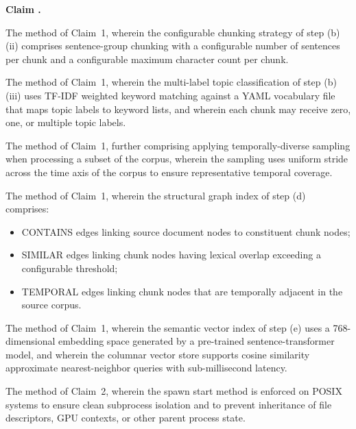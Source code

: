 \documentclass[12pt,letterpaper]{article}
\newcounter{claimnum}
\newenvironment{claims}
  {\begin{list}{\textbf{Claim \arabic{claimnum}.}}
      {\usecounter{claimnum}
       \setlength{\labelwidth}{1.8cm}
       \setlength{\labelsep}{0.4cm}
       \setlength{\leftmargin}{2.2cm}
       \setlength{\itemsep}{12pt}
       \setlength{\parsep}{4pt}}}
  {\end{list}}
\begin{document}
\begin{claims}
\setcounter{claimnum}{3}

\item The method of Claim~1, wherein the configurable chunking strategy of step
(b)(ii) comprises sentence-group chunking with a configurable number of sentences per
chunk and a configurable maximum character count per chunk.

\item The method of Claim~1, wherein the multi-label topic classification of step
(b)(iii) uses TF-IDF weighted keyword matching against a YAML vocabulary file that maps
topic labels to keyword lists, and wherein each chunk may receive zero, one, or multiple
topic labels.

\item The method of Claim~1, further comprising applying temporally-diverse sampling
when processing a subset of the corpus, wherein the sampling uses uniform stride across
the time axis of the corpus to ensure representative temporal coverage.

\item The method of Claim~1, wherein the structural graph index of step (d) comprises:
\begin{itemize}[leftmargin=1.8cm, itemsep=3pt]
  \item CONTAINS edges linking source document nodes to constituent chunk nodes;
  \item SIMILAR edges linking chunk nodes having lexical overlap exceeding a configurable
        threshold;
  \item TEMPORAL edges linking chunk nodes that are temporally adjacent in the source
        corpus.
\end{itemize}

\item The method of Claim~1, wherein the semantic vector index of step (e) uses a
768-dimensional embedding space generated by a pre-trained sentence-transformer model,
and wherein the columnar vector store supports cosine similarity approximate
nearest-neighbor queries with sub-millisecond latency.

\item The method of Claim~2, wherein the spawn start method is enforced on POSIX
systems to ensure clean subprocess isolation and to prevent inheritance of file
descriptors, GPU contexts, or other parent process state.


\end{claims}
\end{document}

